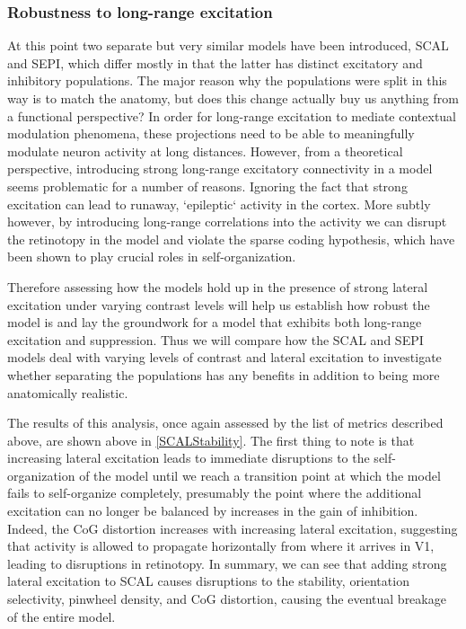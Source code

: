 \subsubsection{Robustness to long-range excitation}

At this point two separate but very similar models have been
introduced, SCAL and SEPI, which differ mostly in that the latter has
distinct excitatory and inhibitory populations. The major reason why
the populations were split in this way is to match the anatomy, but
does this change actually buy us anything from a functional
perspective? In order for long-range excitation to mediate contextual
modulation phenomena, these projections need to be able to
meaningfully modulate neuron activity at long distances. However, from
a theoretical perspective, introducing strong long-range excitatory
connectivity in a model seems problematic for a number of
reasons. Ignoring the fact that strong excitation can lead to runaway,
`epileptic` activity in the cortex. More subtly however, by
introducing long-range correlations into the activity we can disrupt
the retinotopy in the model and violate the sparse coding hypothesis,
which have been shown to play crucial roles in self-organization.

Therefore assessing how the models hold up in the presence of strong
lateral excitation under varying contrast levels will help us
establish how robust the model is and lay the groundwork for a model
that exhibits both long-range excitation and suppression. Thus we will
compare how the SCAL and SEPI models deal with varying levels of
contrast and lateral excitation to investigate whether separating the
populations has any benefits in addition to being more anatomically
realistic.

The results of this analysis, once again assessed by the list of
metrics described above, are shown above in \ref{SCALStability}. The
first thing to note is that increasing lateral excitation leads to
immediate disruptions to the self-organization of the model until we
reach a transition point at which the model fails to self-organize
completely, presumably the point where the additional excitation can
no longer be balanced by increases in the gain of inhibition. Indeed,
the CoG distortion increases with increasing lateral excitation,
suggesting that activity is allowed to propagate horizontally from
where it arrives in V1, leading to disruptions in retinotopy. In
summary, we can see that adding strong lateral excitation to SCAL
causes disruptions to the stability, orientation selectivity, pinwheel
density, and CoG distortion, causing the eventual breakage of the
entire model.

